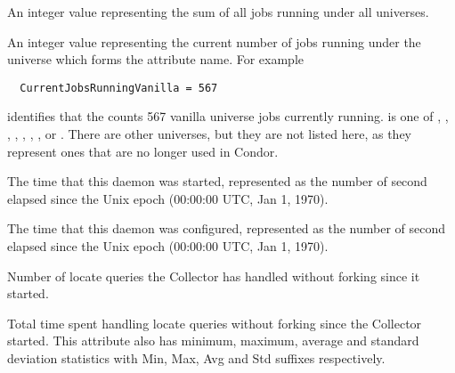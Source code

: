 \begin{description}
\item[\AdAttr{CurrentJobsRunningAll}:] An integer value representing the sum of
  all jobs running under all universes.

\item[\AdAttr{CurrentJobsRunning<universe>}:] An integer value representing
  the current number of jobs running under the universe which forms 
  the attribute name.  For example
\begin{verbatim}
  CurrentJobsRunningVanilla = 567
\end{verbatim}
  identifies that the  counts 567 vanilla universe jobs
  currently running.
   is one of 
  , , , ,
  , , , or .
  There are other universes, but they are not listed here, as they represent
  ones that are no longer used in Condor.

\item[\AdAttr{DaemonStartTime}:] The time that this daemon was
  started, represented as the number of second elapsed since
  the Unix epoch (00:00:00 UTC, Jan 1, 1970).

\item[\AdAttr{DaemonLastReconfigTime}:] The time that this daemon was
  configured, represented as the number of second elapsed since
  the Unix epoch (00:00:00 UTC, Jan 1, 1970).

\item[\AdAttr{HandleLocate}:] Number of locate queries the Collector has handled without forking since it started.

\item[\AdAttr{HandleLocateRuntime}:] Total time spent handling locate queries without forking since the Collector started.
This attribute also has minimum, maximum, average and standard deviation statistics with Min, Max, Avg and Std suffixes respectively.


\end{description}
